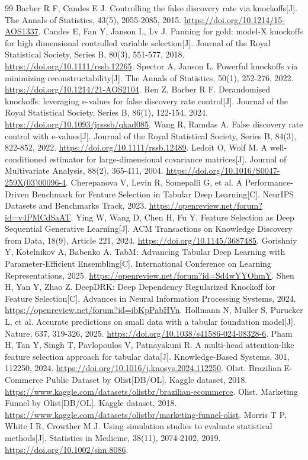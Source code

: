 \documentclass[UTF8,12pt,a4paper]{ctexart}
\begin{document}
\begin{thebibliography}{99}
 Barber R F, Candes E J. Controlling the false discovery rate via knockoffs[J]. The Annals of Statistics, 43(5), 2055-2085, 2015. \url{https://doi.org/10.1214/15-AOS1337}.
 Candes E, Fan Y, Janson L, Lv J. Panning for gold: model-X knockoffs for high dimensional controlled variable selection[J]. Journal of the Royal Statistical Society, Series B, 80(3), 551-577, 2018. \url{https://doi.org/10.1111/rssb.12265}.
 Spector A, Janson L. Powerful knockoffs via minimizing reconstructability[J]. The Annals of Statistics, 50(1), 252-276, 2022. \url{https://doi.org/10.1214/21-AOS2104}.
 Ren Z, Barber R F. Derandomised knockoffs: leveraging e-values for false discovery rate control[J]. Journal of the Royal Statistical Society, Series B, 86(1), 122-154, 2024. \url{https://doi.org/10.1093/jrsssb/qkad085}.
 Wang R, Ramdas A. False discovery rate control with e-values[J]. Journal of the Royal Statistical Society, Series B, 84(3), 822-852, 2022. \url{https://doi.org/10.1111/rssb.12489}.
 Ledoit O, Wolf M. A well-conditioned estimator for large-dimensional covariance matrices[J]. Journal of Multivariate Analysis, 88(2), 365-411, 2004. \url{https://doi.org/10.1016/S0047-259X(03)00096-4}.
 Cherepanova V, Levin R, Somepalli G, et al. A Performance-Driven Benchmark for Feature Selection in Tabular Deep Learning[C]. NeurIPS Datasets and Benchmarks Track, 2023. \url{https://openreview.net/forum?id=v4PMCdSaAT}.
 Ying W, Wang D, Chen H, Fu Y. Feature Selection as Deep Sequential Generative Learning[J]. ACM Transactions on Knowledge Discovery from Data, 18(9), Article 221, 2024. \url{https://doi.org/10.1145/3687485}.
 Gorishniy Y, Kotelnikov A, Babenko A. TabM: Advancing Tabular Deep Learning with Parameter-Efficient Ensembling[C]. International Conference on Learning Representations, 2025. \url{https://openreview.net/forum?id=Sd4wYYOhmY}.
 Shen H, Yan Y, Zhao Z. DeepDRK: Deep Dependency Regularized Knockoff for Feature Selection[C]. Advances in Neural Information Processing Systems, 2024. \url{https://openreview.net/forum?id=ibKpPabHVn}.
 Hollmann N, Muller S, Purucker L, et al. Accurate predictions on small data with a tabular foundation model[J]. Nature, 637, 319-326, 2025. \url{https://doi.org/10.1038/s41586-024-08328-6}.
 Pham H, Tan Y, Singh T, Pavlopoulos V, Patnayakuni R. A multi-head attention-like feature selection approach for tabular data[J]. Knowledge-Based Systems, 301, 112250, 2024. \url{https://doi.org/10.1016/j.knosys.2024.112250}.
 Olist. Brazilian E-Commerce Public Dataset by Olist[DB/OL]. Kaggle dataset, 2018. \url{https://www.kaggle.com/datasets/olistbr/brazilian-ecommerce}.
 Olist. Marketing Funnel by Olist[DB/OL]. Kaggle dataset, 2018. \url{https://www.kaggle.com/datasets/olistbr/marketing-funnel-olist}.
 Morris T P, White I R, Crowther M J. Using simulation studies to evaluate statistical methods[J]. Statistics in Medicine, 38(11), 2074-2102, 2019. \url{https://doi.org/10.1002/sim.8086}.
\end{thebibliography}
\end{document}
